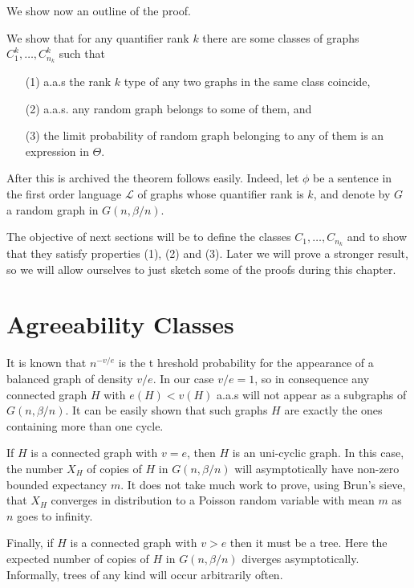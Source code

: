 \documentclass[11pt,notitlepage]{report}
\theoremstyle{definition}
\newcommand{\Lan}{\mathcal{L}}
\begin{document}
We show now an outline of the proof. \par 
We show that for any quantifier rank $k$ there are some classes of graphs 
$C^k_1,\dots, C^k_{n_k}$ such that
\begin{itemize}[noitemsep, topsep=0pt]
	\item[(1)] a.a.s the rank $k$ type of any two graphs in the same class coincide, 
	\item[(2)] a.a.s. any random graph belongs to some of them, and
	\item[(3)] the limit probability of random graph belonging to any of them is an expression in $\Theta$. 
\end{itemize}

After this is archived the theorem follows easily. Indeed, let $\phi$ be a sentence 
in the first order language $\Lan$ of graphs whose quantifier rank is $k$, and denote by
$G$ a random graph in $G(n,\beta/n)$. \par

The objective of next sections will be to define the classes $C_1,\dots, C_{n_k}$ and to show
that they satisfy properties (1), (2) and (3). Later we will prove a stronger result, so we will
allow ourselves to just sketch some of the proofs during this chapter. 

\section{Agreeability Classes}


It is known that $n^{-v/e}$ is the t
hreshold probability for the appearance 
of a balanced graph of density $v/e$. 
In our case $v/e=1$, so in consequence any connected graph $H$
with $e(H)< v(H)$ a.a.s will not appear 
as a subgraphs of $G(n,\beta/n)$. It can be easily 
shown that such graphs $H$ are exactly 
the ones containing more than one cycle. \par

If $H$ is a connected graph with $v=e$, then $H$ is an uni-cyclic graph.
In this case, the number $X_H$ of copies of $H$ 
in $G(n,\beta/n)$ will asymptotically have non-zero bounded expectancy $m$. 
It does not take much work to prove, using Brun's sieve, 
that $X_H$ converges in distribution to a Poisson 
random variable with mean $m$ as $n$ goes to infinity.  \par

Finally, if $H$ is a connected graph 
with $v>e$ then it must be a tree. Here 
the expected number of copies of $H$ 
in $G(n,\beta/n)$ diverges asymptotically. 
Informally, trees of any kind will occur arbitrarily often. \par
\end{document}

